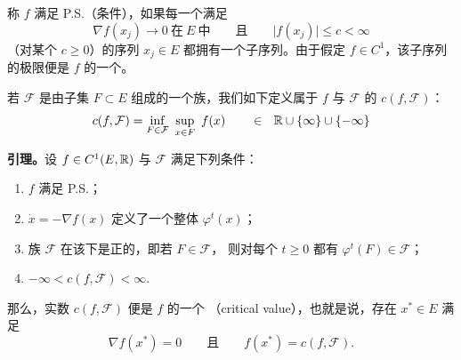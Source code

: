 \begin{definition}\label{def:palais-smale}
称 $f$ 满足 P.S.（\trPalaisSmale{}条件），如果每一个满足
\[
\nabla f(x_{j})\rightarrow0\ \text{在}\ E\ \text{中}\qquad\text{且}\qquad\bigl|f(x_{j})\bigr|\leq c<\infty
\]
（对某个 $c\geq0$）的序列 $x_{j}\in E$ 都拥有一个\trConverge{}子序列。由于假定%
$f\in C^{1}$，该子序列的极限便是 $f$ 的一个\trCriticalPoint。
\end{definition}

若 $\mathcal{F}$ 是由子集 $F\subset E$ 组成的一个族，我们如下定义属于 $f$ 与%
$\mathcal{F}$ 的\trMinimax{} $c(f,\mathcal{F})$：
\[
c(f,\mathcal{F})=\inf_{F\in\mathcal{F}}\ \sup_{x\in F}\ f(x)\qquad\in\ \ \R\cup\{\infty\}\cup\{-\infty\}
\]

\textbf{\trMinimax{}引理。}\quad 设 $f\in C^{1}(E,\mathbb{R})$ 与 $\mathcal{F}$ 满足下列条件：
\begin{enumerate}[label=(\roman*)]
\item $f$ 满足 P.S.；
\item $\dot{x}=-\nabla f(x)$ 定义了一个整体\trFlow{} $\varphi^{t}(x)$；
\item 族 $\mathcal{F}$ 在该\trFlow{}下是正\trInvariant{}的，即若 $F\in\mathcal{F}$，%
则对每个 $t\geq0$ 都有 $\varphi^{t}(F)\in\mathcal{F}$；
\item $-\infty<c(f,\mathcal{F})<\infty$.
\end{enumerate}
那么，实数 $c(f,\mathcal{F})$ 便是 $f$ 的一个\textbf{\trCriticalValue}%
（critical value），也就是说，存在 $x^{*}\in E$ 满足
\[
\nabla f(x^{*})=0\qquad\text{且}\qquad f(x^{*})=c(f,\mathcal{F}).
\]

